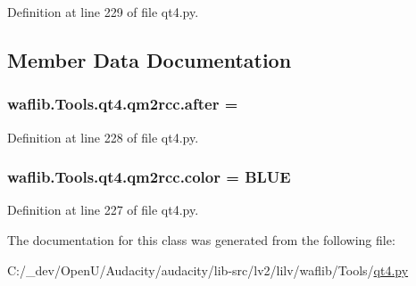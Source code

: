 Definition at line 229 of file qt4.\+py.



\subsection{Member Data Documentation}
\subsubsection[{\texorpdfstring{after}{after}}]{ waflib.\+Tools.\+qt4.\+qm2rcc.\+after = \textquotesingle{}\hspace{0.3cm}{\ttfamily [static]}}\hypertarget{classwaflib_1_1_tools_1_1qt4_1_1qm2rcc_a0247989000278ea986ad6952cf39fe14}{}\label{classwaflib_1_1_tools_1_1qt4_1_1qm2rcc_a0247989000278ea986ad6952cf39fe14}


Definition at line 228 of file qt4.\+py.

\subsubsection[{\texorpdfstring{color}{color}}]{ waflib.\+Tools.\+qt4.\+qm2rcc.\+color = \textquotesingle{}B\+L\+UE\textquotesingle{}\hspace{0.3cm}{\ttfamily [static]}}\hypertarget{classwaflib_1_1_tools_1_1qt4_1_1qm2rcc_a9f66baeef0af6fb62b4f2af2fb002742}{}\label{classwaflib_1_1_tools_1_1qt4_1_1qm2rcc_a9f66baeef0af6fb62b4f2af2fb002742}


Definition at line 227 of file qt4.\+py.



The documentation for this class was generated from the following file\+:\begin{DoxyCompactItemize}
\item 
C\+:/\+\_\+dev/\+Open\+U/\+Audacity/audacity/lib-\/src/lv2/lilv/waflib/\+Tools/\hyperlink{lilv_2waflib_2_tools_2qt4_8py}{qt4.\+py}\end{DoxyCompactItemize}
